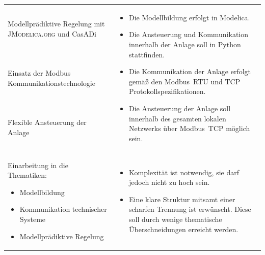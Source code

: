 \begin{table}[H]
\begin{tabularx}{1\textwidth}{m{}m{}}
\addlinespace[1mm] Modellprädiktive Regelung mit \textsc{JModelica.org} und CasADi \newline & \multirow{3}{\hsize}{
\begin{minipage}[t]{0.57\textwidth}
\begin{itemize}[itemsep=0pt,topsep=0pt,leftmargin=5mm]
\item Die Modellbildung erfolgt in Modelica.
\item Die Ansteuerung und Kommunikation innerhalb der Anlage soll in Python stattfinden.
\item Die Kommunikation der Anlage erfolgt gemäß den Modbus~RTU und TCP Protokollspezifikationen.
\item Die Ansteuerung der Anlage soll innerhalb des gesamten lokalen Netzwerks über Modbus~TCP möglich sein.
\end{itemize}
\end{minipage}
}  \\

\cmidrule[0.1pt](lr{2em}){1-1}
\addlinespace[1mm] Einsatz der Modbus \newline Kommunikationstechnologie \newline 	& 		\\

\cmidrule[0.1pt](lr{2em}){1-1}
\addlinespace[1mm] Flexible Ansteuerung der Anlage \newline & \\

\cmidrule[0.5pt](r{0.25em}){1-1} 
\cmidrule[0.5pt](l{0.25em}){2-2}

Einarbeitung in die Thematiken:
\begin{minipage}[t]{0.34\textwidth}
\begin{itemize}[itemsep=0pt,topsep=0pt,leftmargin=4mm]
	\item Modellbildung
	\item Kommunikation technischer \newline Systeme
	\item Modellprädiktive Regelung
\end{itemize}
\end{minipage}
 	& \multirow{2}{\hsize}{
\begin{minipage}[t]{0.57\textwidth}
\begin{itemize}[itemsep=0pt,topsep=0pt,leftmargin=5mm]
	\item Komplexität ist notwendig, sie darf jedoch nicht zu hoch sein.
	\item Eine klare Struktur mitsamt einer scharfen Trennung ist erwünscht. Diese soll durch wenige thematische Überschneidungen erreicht werden.
\end{itemize}
\end{minipage}
}  \\


\end{tabularx}
\end{table}
